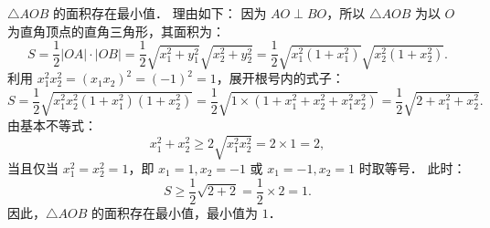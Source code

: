 \begin{answer}
$\triangle AOB$ 的面积存在最小值．
理由如下：
因为 $AO \perp BO$，所以 $\triangle AOB$ 为以 $O$ 为直角顶点的直角三角形，其面积为：
\nopagebreak[4]
\[
S = \frac{1}{2} |OA| \cdot |OB| = \frac{1}{2} \sqrt{x_1^2 + y_1^2} \sqrt{x_2^2 + y_2^2} = \frac{1}{2} \sqrt{x_1^2(1 + x_1^2)} \sqrt{x_2^2(1 + x_2^2)}.
\]
利用 $x_1^2 x_2^2 = (x_1 x_2)^2 = (-1)^2 = 1$，展开根号内的式子：
\nopagebreak[4]
\[
S = \frac{1}{2} \sqrt{x_1^2 x_2^2 (1 + x_1^2)(1 + x_2^2)} = \frac{1}{2} \sqrt{1 \times (1 + x_1^2 + x_2^2 + x_1^2 x_2^2)} = \frac{1}{2} \sqrt{2 + x_1^2 + x_2^2}.
\]
由基本不等式：
\nopagebreak[4]
\[
x_1^2 + x_2^2 \geqslant 2\sqrt{x_1^2 x_2^2} = 2 \times 1 = 2,
\]
当且仅当 $x_1^2 = x_2^2 = 1$，即 $x_1 = 1, x_2 = -1$ 或 $x_1 = -1, x_2 = 1$ 时取等号．
此时：
\nopagebreak[4]
\[
S \geqslant \frac{1}{2} \sqrt{2 + 2} = \frac{1}{2} \times 2 = 1.
\]
因此，$\triangle AOB$ 的面积存在最小值，最小值为 $1$．



\end{answer}
